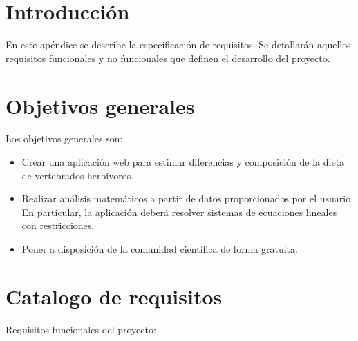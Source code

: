 
\section{Introducción}

En este apéndice se describe la especificación de requisitos. Se detallarán aquellos requisitos funcionales y no funcionales que definen el desarrollo del proyecto.

\section{Objetivos generales}

Los objetivos generales son: 

\begin{itemize}
    \item Crear una aplicación web para estimar diferencias y composición de la dieta de vertebrados herbívoros.
    \item Realizar análisis matemáticos a partir de datos proporcionados por el usuario. En particular, la aplicación deberá resolver sistemas de ecuaciones lineales con restricciones.
    \item Poner a disposición de la comunidad científica de forma gratuita.
\end{itemize}

\section{Catalogo de requisitos}

Requisitos funcionales del proyecto:

